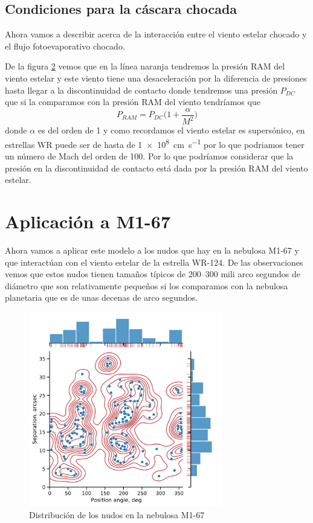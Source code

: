 \documentclass{book}
\begin{document}
\section{Condiciones para la cáscara chocada}

Ahora vamos a describir acerca de la interacción entre el viento estelar chocado y el flujo fotoevaporativo chocado. 

De la figura \ref{} vemos que en la línea naranja tendremos la presión RAM del viento estelar y este viento tiene una desaceleración por la diferencia de presiones hasta llegar a la discontinuidad de contacto donde tendremos una presión $P_{DC}$ que si la comparamos con la presión RAM del viento tendríamos que
\[P_{RAM}=P_{DC}\Big(1+\frac{\alpha}{M^2}\Big)\] donde $\alpha$ es del orden de 1 y como recordamos el viento estelar es supersónico, en estrellas WR puede ser de hasta de \SI{1e8}{cm.s^{-1}} por lo que podriamos tener un número de Mach del orden de 100. Por lo que podríamos considerar que la presión en la discontinuidad de contacto está dada por la presión RAM del viento estelar.


\chapter{Aplicación a M1-67}

Ahora vamos a aplicar este modelo a los nudos que hay en la nebulosa M1-67 y que interactúan con el viento estelar de la estrella WR-124. De las observaciones vemos que estos nudos tienen tamaños típicos de 200--300 mili arco segundos de diámetro que son relativamente pequeños si los comparamos con la nebulosa planetaria que es de unas decenas de arco segundos. 

\begin{figure}[h!]
    \centering    \includegraphics[width=0.75\textwidth]{images Chapter 2/C2_nudos_distribucion.png}
    \caption{Distribución de los nudos en la nebulosa M1-67}
    \label{fig:dis_nudos}
\end{figure}
\end{document}
